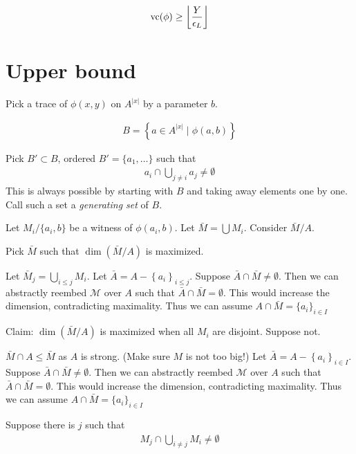 \documentclass{amsart}
\newcommand{\M}{\mathcal M}
\newcommand{\curly}[1]{\left\{#1\right\}}
\providecommand{\floor}[1]{\left \lfloor #1 \right \rfloor }
\begin{document}
\begin{align*}
	\vc(\phi) \geq \floor{\frac{Y}{\epsilon_L}}
\end{align*}

\section*{Upper bound}

Pick a trace of $\phi(x,y)$ on $A^{|x|}$ by a parameter $b$.

\begin{align*}
	B = \curly{a \in A^{|x|} \mid \phi(a, b)}
\end{align*}

Pick $B' \subset B$, ordered $B' = \{a_1, \ldots\}$ such that
\begin{align*}
	a_i \cap \bigcup_{j \neq i} a_j \neq \emptyset
\end{align*}
This is always possible by starting with $B$ and taking away elements one by one.
Call such a set a \emph{generating set} of $B$.

Let $M_i / \{a_i, b\}$ be a witness of $\phi(a_i, b)$.
Let $\bar M = \bigcup M_i$.
Consider $\bar M / A$.

Pick $\bar M$ such that $\dim(\bar M / A)$ is maximized.

Let $\bar M_j = \bigcup_{i \leq j} M_i$.
Let $\bar A = A - \curly{a_i}_{i \leq j}$.
Suppose $\bar A \cap \bar M \neq \emptyset$.
Then we can abstractly reembed $\M$ over $A$ such that $\bar A \cap \bar M = \emptyset$.
This would increase the dimension, contradicting maximality.
Thus we can assume $A \cap \bar M = \{a_i\}_{i \in I}$



Claim: $\dim(\bar M / A)$ is maximized when all $M_i$ are disjoint.
Suppose not.

$\bar M \cap A \leq \bar M$ as $A$ is strong. (Make sure $M$ is not too big!)
Let $\bar A = A - \curly{a_i}_{i \in I}$.
Suppose $\bar A \cap \bar M \neq \emptyset$.
Then we can abstractly reembed $\M$ over $A$ such that $\bar A \cap \bar M = \emptyset$.
This would increase the dimension, contradicting maximality.
Thus we can assume $A \cap \bar M = \{a_i\}_{i \in I}$

Suppose there is $j$ such that
\begin{align*}
	M_j \cap \bigcup_{i \neq j} M_i \neq \emptyset
\end{align*}
\end{document}
